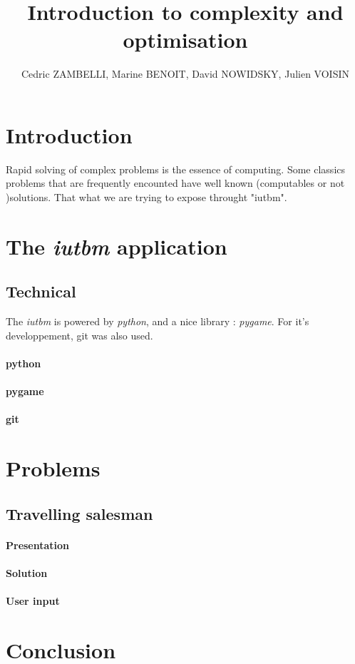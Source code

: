 \documentclass[a4paper, 11pt]{article}
\title{Introduction to complexity and optimisation}
\author{Cedric ZAMBELLI, Marine BENOIT, David NOWIDSKY, Julien VOISIN}
\begin{document}
	\maketitle

	\section*{Introduction}
        Rapid solving of complex problems is the essence of computing.
        Some classics problems that are frequently encounted
        have well known (computables or not )solutions.
        That what we are trying to expose throught "iutbm".

    \section{The \emph{iutbm} application}
        \subsection{Technical}
            The \emph{iutbm} is powered by \emph{python},
            and a nice library : \emph{pygame}.
            For it's developpement, git was also used.
            \paragraph{python}
            \paragraph{pygame}
            \paragraph{git}

    \section{Problems}
        \subsection{Travelling salesman}
            \paragraph{Presentation}
            \paragraph{Solution}
            \paragraph{User input}

    \section*{Conclusion}
\end{document}
